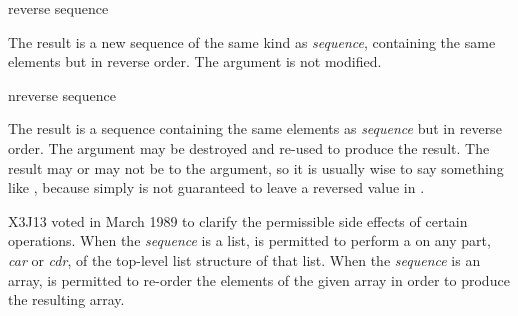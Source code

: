 \begin{defun}[Function]
reverse sequence

The result is a new sequence of the same kind as \emph{sequence},
containing the same elements but in reverse order.
The argument is not modified.
\end{defun}

\begin{defun}[Function]
nreverse sequence

The result is a sequence containing the same elements as \emph{sequence}
but in reverse order.  The argument may be destroyed and re-used to
produce the result.  The result may or may not be  to the
argument, so it is usually wise to say something like
, because simply  is not
guaranteed to leave a reversed value in .
\begin{newer}
X3J13 voted in March 1989 
to clarify the permissible side effects of certain operations.
When the \emph{sequence} is a list,
 is permitted to perform a  on any part,
\emph{car} or \emph{cdr}, of the top-level list structure of that list.
When the \emph{sequence} is an array,
 is permitted to re-order the elements of the given array
in order to produce the resulting array.
\end{newer}
\end{defun}

